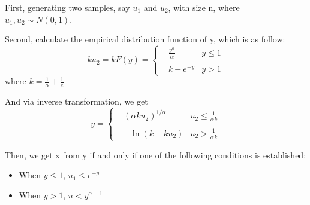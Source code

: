 \documentclass[10pt,stdletter,dateno,sigleft]{newlfm}
\begin{document}
First, generating two samples, say $u_1$ and $u_2$, with size n, where $u_1, u_2 \sim N(0, 1)$.

Second, calculate the empirical distribution function of y, which is as follow:
\begin{equation*}
k u_2=k F(y)=
\left\{
\begin{aligned}
& \frac{y^\alpha} {\alpha}            & y\leq 1\\
\\
& k-e^{-y} & y> 1
\end{aligned}
\right.
\end{equation*}
where $k=\frac{1}{\alpha}+\frac{1}{e}$

And via inverse transformation, we get
\begin{equation*}
y=
\left\{
\begin{aligned}
& (\alpha k u_2)^{1/\alpha} & u_2\leq \frac{1}{\alpha k}\\
\\
& -\ln(k-k u_2) & u_2> \frac{1}{\alpha k}
\end{aligned}
\right.
\end{equation*}

Then, we get x from y if and only if one of the following conditions is established:
\begin{itemize}
\item When $y \leq 1$, $u_1 \leq e^{-y}$
\item When $y > 1$, $u < y^{\alpha-1}$
\end{itemize}
\end{document}
